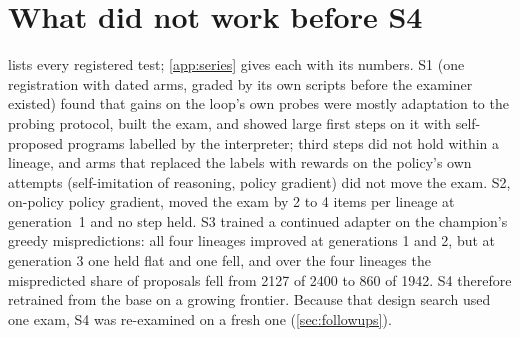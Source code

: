 
\section{What did not work before S4}\label{sec:earlier}

 lists every registered test; \cref{app:series} gives each with its numbers. S1 (one
registration with dated arms, graded by its own scripts before the examiner existed) found that gains on
the loop's own probes were mostly adaptation to the probing protocol, built the exam, and showed large
first steps on it with self-proposed programs labelled by the interpreter; third steps did not hold
within a lineage, and arms that replaced the labels with rewards on the policy's own attempts (self-imitation
of reasoning, policy gradient) did not move the exam. S2, on-policy policy
gradient, moved the exam by 2 to 4 items per lineage at generation~1 and no step held. S3 trained
a continued adapter on the champion's greedy mispredictions: all four lineages improved at generations 1
and 2, but at generation 3 one held flat and one fell, and over the four lineages the mispredicted share
of proposals fell from 2127 of 2400 to 860 of 1942. S4 therefore retrained from the base
on a growing frontier. Because that design search used one exam, S4 was re-examined on a fresh one
(\cref{sec:followups}).


